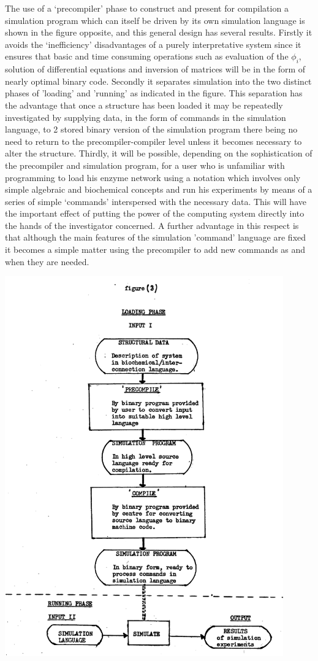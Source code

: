 The use of a `precompiler' phase to construct and present for compilation a simulation program which can itself be driven by its own simulation language is shown in the figure opposite, and this general design has several results. Firstly it avoids the `inefficiency' disadvantages of a purely interpretative system since it ensures that basic and time consuming operations such as evaluation of the $\phi_{i}$, solution of differential equations and inversion of matrices will be in the form of nearly optimal binary code. Secondly it separates simulation into the two distinct phases of 'loading' and 'running' as indicated in the figure. This separation has the advantage that once a structure has been loaded it may be repeatedly investigated by supplying data, in the form of commands in the simulation language, to 2 stored binary version of the simulation program there being no need to return to the precompiler-compiler level unless it becomes necessary to alter the structure. Thirdly, it will be possible, depending on the sophistication of the precompiler and simulation program, for a user who is unfamiliar with programming to load his enzyme network using a notation which involves only simple algebraic and biochemical concepts and run his experiments by means of a series of simple `commands' interspersed with the necessary data. This will have the important effect of putting the power of the computing system directly into the hands of the investigator concerned. A further advantage in this respect is that although the main features of the simulation 'command' language are fixed it becomes a simple matter using the precompiler to add new commands as and when they are needed.

\includegraphics[max width=0.9\textwidth]{figure3_3.png}

